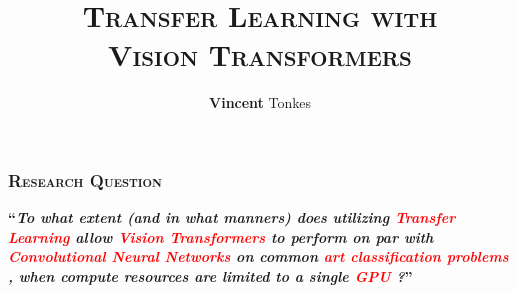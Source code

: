 \documentclass{beamer}
\title{\textsc{\bfseries Transfer Learning with\\Vision Transformers}}
\author{\textbf{Vincent} Tonkes}
\institute{\textbf{University} of Groningen}
\date{}
\newcommand{\createtitle}[1]{\frametitle{\textsc{\bfseries#1}}}
\begin{document}
{
}

\newcommand{\toexplain}[1]{
    \textcolor<2>{white}{\textcolor<3>{red}{#1}}
}

\begin{frame}
\createtitle{Research Question}
\begin{center}
\textbf{\large ``\textit{To what extent (and in what manners) does utilizing \toexplain{Transfer Learning} allow \toexplain{Vision Transformers} to perform on par with \toexplain{Convolutional Neural Networks} on common \toexplain{art classification problems}, when compute resources are limited to a single \toexplain{GPU}?}''}
\end{center}
\end{frame}
\end{document}
